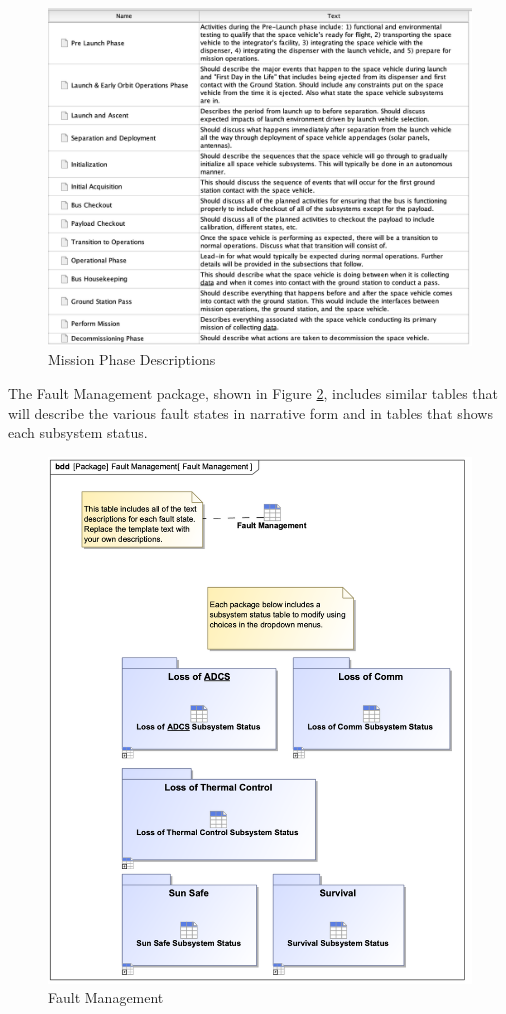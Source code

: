 \begin{figure}[H]
    \centering
    \includegraphics[width=\textwidth]{Thesis/Analysis_and_Results/Analysis and Results Figures/Mission Phase Descriptions.png}
    \caption{Mission Phase Descriptions}
    \label{fig:Mission Phase Descriptions}
\end{figure}

The Fault Management package, shown in Figure \ref{fig:Fault Management}, includes similar tables that will describe the various fault states in narrative form and in tables that shows each subsystem status.

\begin{figure}[H]
    \centering
    \includegraphics[width=4 in]{Thesis/Analysis_and_Results/Analysis and Results Figures/Fault Management.png}
    \caption{Fault Management}
    \label{fig:Fault Management}
\end{figure}

